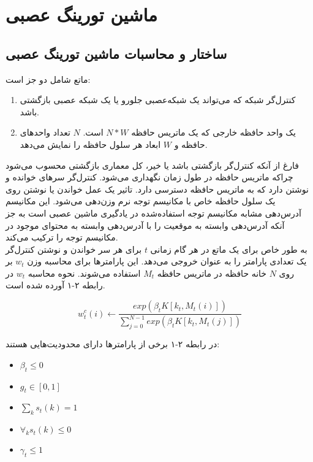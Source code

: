 \chapter{ماشین تورینگ عصبی}
\section{ساختار و محاسبات ماشین تورینگ عصبی}
ماتع شامل دو جز است:
\begin{enumerate}
\item کنترل‌گر شبکه که می‌تواند یک شبکه‌عصبی جلورو یا یک شبکه عصبی بازگشتی باشد.
\item یک واحد حافظه خارجی که یک ماتریس حافظه $N*W$ است. $N$ تعداد واحد‌های حافظه و $W$ ابعاد هر سلول حافظه را نمایش می‌دهد.\cite{collier2018implementing}
\end{enumerate}

فارغ از آنکه کنترل‌گر بازگشتی باشد یا خیر، کل معماری بازگشتی محسوب می‌شود چراکه ماتریس حافظه در طول زمان نگهداری می‌شود. کنترل‌گر سرهای خوانده و نوشتن دارد که به ماتریس حافظه دسترسی دارد. تاثیر یک عمل خواندن یا نوشتن روی یک سلول حافظه خاص با مکانیسم توجه نرم وزن‌دهی می‌شود. این مکانیسم آدرس‌دهی مشابه مکانیسم توجه استفاده‌شده در یادگیری ماشین عصبی است به جز آنکه آدرس‌دهی وابسته به موقعیت را با آدرس‌دهی وابسته به محتوای موجود در مکانیسم توجه  را ترکیب می‌کند.\cite{collier2018implementing}
\\

به طور خاص برای یک ماتع در هر گام زمانی $t$ برای هر سر خواندن و نوشتن کنترل‌گر یک تعدادی پارامتر را به عنوان خروجی می‌دهد. این پارامتر‌ها برای محاسبه وزن $w_t$ بر روی $N$ خانه حافظه در ماتریس حافظه $M_t$ استفاده می‌شوند. نحوه محاسبه $w_t$ در رابطه ۲-۱ آورده شده است.\cite{collier2018implementing}

\begin{equation}
w^c_t(i) \leftarrow \frac{exp(\beta_t K[k_t,M_t(i)])}{\sum_{j=0}^{N-1} exp(\beta_t K[k_t,M_t(j)])}
\end{equation}

در رابطه ۲-۱ برخی از پارامترها دارای محدودیت‌هایی هستند:\cite{collier2018implementing}
\begin{itemize}
\item $\beta_t \le 0$
\item $g_t \in [0, 1]$
\item $\sum_k s_t(k) = 1$
\item $\forall_k s_t(k) \le 0$
\item $\gamma_t \le 1$
\end{itemize}

